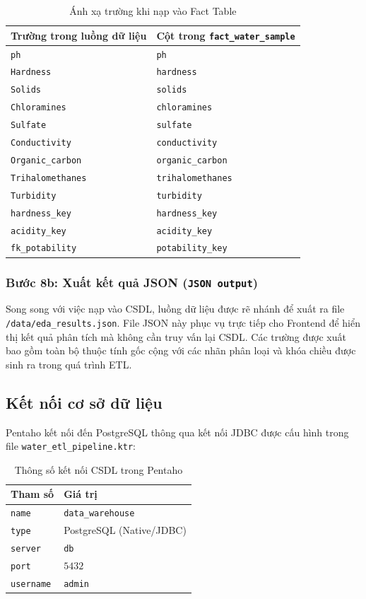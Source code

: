 \begin{table}[H]
\centering
\caption{Ánh xạ trường khi nạp vào Fact Table}
\label{tab:fact_mapping}
\begin{tabular}{ll}
\hline
\textbf{Trường trong luồng dữ liệu} & \textbf{Cột trong \texttt{fact\_water\_sample}} \\
\hline
\texttt{ph} & \texttt{ph} \\
\texttt{Hardness} & \texttt{hardness} \\
\texttt{Solids} & \texttt{solids} \\
\texttt{Chloramines} & \texttt{chloramines} \\
\texttt{Sulfate} & \texttt{sulfate} \\
\texttt{Conductivity} & \texttt{conductivity} \\
\texttt{Organic\_carbon} & \texttt{organic\_carbon} \\
\texttt{Trihalomethanes} & \texttt{trihalomethanes} \\
\texttt{Turbidity} & \texttt{turbidity} \\
\texttt{hardness\_key} & \texttt{hardness\_key} \\
\texttt{acidity\_key} & \texttt{acidity\_key} \\
\texttt{fk\_potability} & \texttt{potability\_key} \\
\hline
\end{tabular}
\end{table}

\subsubsection{Bước 8b: Xuất kết quả JSON (\texttt{JSON output})}

Song song với việc nạp vào CSDL, luồng dữ liệu được rẽ nhánh để xuất ra file \texttt{/data/eda\_results.json}. File JSON này phục vụ trực tiếp cho Frontend để hiển thị kết quả phân tích mà không cần truy vấn lại CSDL. Các trường được xuất bao gồm toàn bộ thuộc tính gốc cộng với các nhãn phân loại và khóa chiều được sinh ra trong quá trình ETL.

\subsection{Kết nối cơ sở dữ liệu}

Pentaho kết nối đến PostgreSQL thông qua kết nối JDBC được cấu hình trong file \texttt{water\_etl\_pipeline.ktr}:
 
\begin{table}[H]
\centering
\caption{Thông số kết nối CSDL trong Pentaho}
\label{tab:db_conn}
\begin{tabular}{ll}
\hline
\textbf{Tham số} & \textbf{Giá trị} \\
\hline
\texttt{name} & \texttt{data\_warehouse} \\
\texttt{type} & PostgreSQL (Native/JDBC) \\
\texttt{server} & \texttt{db} \\
\texttt{port} & $5432$ \\
\texttt{username} & \texttt{admin} \\
\hline
\end{tabular}
\end{table}

